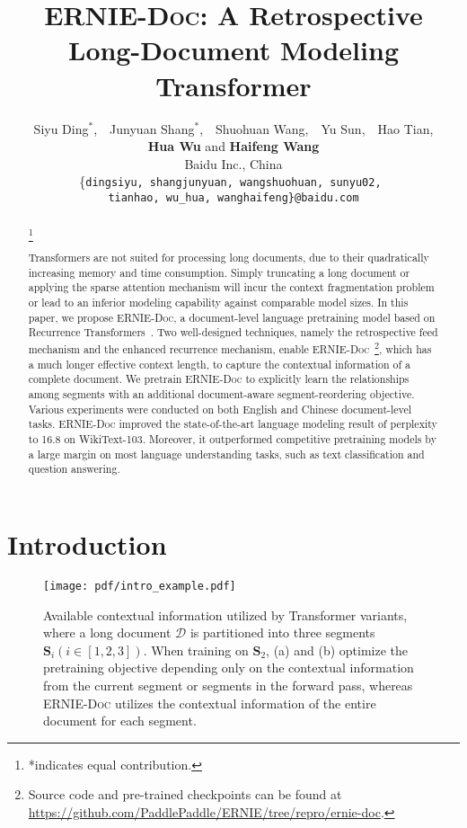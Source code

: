 \documentclass[11pt,a4paper]{article}
\author{
    Siyu Ding$^*$,~~Junyuan Shang$^*$,~~Shuohuan Wang,~~Yu Sun,~~Hao Tian, \\ 
    \textbf{Hua Wu} and \textbf{Haifeng Wang} \\
    Baidu Inc., China\\
    \{\texttt{dingsiyu, shangjunyuan, wangshuohuan, sunyu02, } \\
    \texttt{tianhao, wu\_hua, wanghaifeng\}@baidu.com}
}
\title{\textsc{ERNIE-Doc}: A Retrospective Long-Document Modeling Transformer}
\date{}
\newcommand{\mname}{\textsc{ERNIE-Doc}\xspace}
\newcommand\blfootnote[1]{\begingroup
\renewcommand\thefootnote{}\footnote{#1}\addtocounter{footnote}{-1}\endgroup
}
\begin{document}
\maketitle
\begin{abstract}
\blfootnote{*indicates equal contribution.}
Transformers are not suited for processing long documents, due to their quadratically increasing memory and time consumption. Simply truncating a long document or applying the sparse attention mechanism will incur the context fragmentation problem or lead to an inferior modeling capability against comparable model sizes. In this paper, we propose \mname, a document-level language pretraining model based on Recurrence Transformers~\citep{transformer_xl}. Two well-designed techniques, namely the retrospective feed mechanism and the enhanced recurrence mechanism, enable \mname~\footnote{Source code and pre-trained checkpoints can be found at \url{https://github.com/PaddlePaddle/ERNIE/tree/repro/ernie-doc}.}, which has a much longer effective context length, to capture the contextual information of a complete document. We pretrain \mname to explicitly learn the relationships among segments with an additional document-aware segment-reordering objective. Various experiments were conducted on both English and Chinese document-level tasks. \mname 
improved the state-of-the-art language modeling result of perplexity to 16.8 on WikiText-103. Moreover, it outperformed competitive pretraining models by a large margin on most language understanding tasks, such as text classification and question answering.
\end{abstract}


\section{Introduction}

\begin{figure}[!t]
\centering
\texttt{[image: pdf/intro\_example.pdf]}
\caption{Available contextual information utilized by Transformer variants, where a long document $\mathcal{D}$ is partitioned into three segments $\textbf{S}_i (i \in [1,2,3])$. When training on $\textbf{S}_2$, (a) and (b) optimize the pretraining objective depending only on the contextual information from the current segment or segments in the forward pass, whereas \mname utilizes the contextual information of the entire document for each segment.}
\label{fig:intro-example}
\vspace{-0.5cm}
\end{figure}
\end{document}
